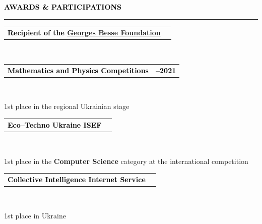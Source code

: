 \documentclass[10pt,english,french]{article}
\makeatletter
\newcommand{\awardIcon}[1][black]{\textcolor{#1}{\faTrophy}}
\newlength{\mpwidth}
\newcommand{\cvsection}[1]{
    \vspace{5pt}
    \textbf{\fontsize{12pt}{10pt}\selectfont \textcolor{black}{#1}}
    \vspace{8pt}
    \hrule
    \vspace{8pt}
}
\newcommand{\cvevent}[2]{
    \vspace{2pt}
    \parbox{\mpwidth}{
        \begin{tabular*}{1\mpwidth}{@{\extracolsep{\fill}} l r}
            \textcolor{black}{\textbf{\fontsize{11}{12}\selectfont #1}} & \textcolor{black}{\textbf{\fontsize{12}{12}\selectfont #2}} \\
        \end{tabular*}\\[-8pt] %
    }
}
\makeatother
\begin{document}
\vspace{-1pt}
\cvsection{\awardIcon[black]\hspace{4pt}AWARDS \& PARTICIPATIONS}

\vspace{-4pt}
\cvevent{Recipient of the \href{https://www.fondationbesse.com/}{Georges Besse Foundation}}{2022}

\vspace{-9pt}
\cvevent{Mathematics and Physics Competitions}{2020\hspace{5pt}--\hspace{5pt}2021}
{1st place in the regional Ukrainian stage}

\vspace{2pt}
\cvevent{Eco\hspace{2pt}--\hspace{2pt}Techno Ukraine ISEF}{2020}
{1st place in the \textbf{Computer Science} category at the international competition}

\vspace{2pt}
\cvevent{Collective Intelligence Internet Service}{2019}
{1st place in Ukraine}

\setlength{\columnsep}{1.2em}
\setlength{\columnseprule}{0pt}
\end{document}
